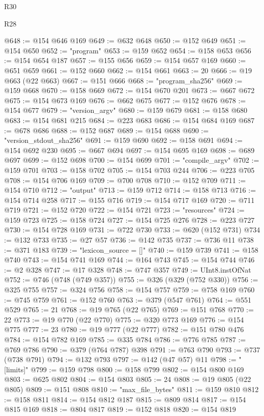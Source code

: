 \begin{lexlean}{R30}
\begin{lexlean}{R28}
\begin{coremodule}
{{{{{{{{{{{{{{{{{{{{{{{{{{{{{{{{{{{{{{{{{{{{{{{{{{{{{{{{{{{{{{{{{{{{{{{{{{{{{{{{{{{{{{{{{{{{{{{{{{{{{{{{{{{{{{{{{{{{{{{{{{{{{{{{{{{{{{{{{{{{{{{@648 := @154 @646 @169
@649 := @632 @648
@650 := @152 @649
@651 := @154 @650
@652 := "program"
@653 := @159 @652
@654 := @158 @653
@656 := @154 @654 @187
@657 := @155 @656
@659 := @154 @657 @169
@660 := @651 @659
@661 := @152 @660
@662 := @154 @661
@663 := 20
@666 := @19 @663 (@22 @663)
@667 := @151 @666
@668 := "program_sha256"
@669 := @159 @668
@670 := @158 @669
@672 := @154 @670 @201
@673 := @667 @672
@675 := @154 @673 @169
@676 := @662 @675
@677 := @152 @676
@678 := @154 @677
@679 := "version_argv"
@680 := @159 @679
@681 := @158 @680
@683 := @154 @681 @215
@684 := @223 @683
@686 := @154 @684 @169
@687 := @678 @686
@688 := @152 @687
@689 := @154 @688
@690 := "version_stdout_sha256"
@691 := @159 @690
@692 := @158 @691
@694 := @154 @692 @230
@695 := @667 @694
@697 := @154 @695 @169
@698 := @689 @697
@699 := @152 @698
@700 := @154 @699
@701 := "compile_argv"
@702 := @159 @701
@703 := @158 @702
@705 := @154 @703 @244
@706 := @223 @705
@708 := @154 @706 @169
@709 := @700 @708
@710 := @152 @709
@711 := @154 @710
@712 := "output"
@713 := @159 @712
@714 := @158 @713
@716 := @154 @714 @258
@717 := @155 @716
@719 := @154 @717 @169
@720 := @711 @719
@721 := @152 @720
@722 := @154 @721
@723 := "resources"
@724 := @159 @723
@725 := @158 @724
@727 := @154 @725 @276
@728 := @223 @727
@730 := @154 @728 @169
@731 := @722 @730
@733 := @620 (@152 @731)
@734 := @132 @733
@735 := @27 @57
@736 := @142 @735
@737 := @736 @11
@738 := @371 @183
@739 := "lexicon_source = []"
@740 := @159 @739
@741 := @158 @740
@743 := @154 @741 @169
@744 := @164 @743
@745 := @154 @744
@746 := @2 @328
@747 := @17 @328
@748 := @747 @357
@749 := UInt8.instOfNat
@752 := @746 (@748 (@749 @357))
@755 := @326 (@329 (@752 @330))
@756 := @325 @755
@757 := @324 @756
@758 := @154 @757
@759 := @758 @169
@760 := @745 @759
@761 := @152 @760
@763 := @379 (@547 @761)
@764 := @551 @529
@765 := 21
@768 := @19 @765 (@22 @765)
@769 := @151 @768
@770 := 22
@773 := @19 @770 (@22 @770)
@775 := @320 @773 @169
@776 := @154 @775
@777 := 23
@780 := @19 @777 (@22 @777)
@782 := @151 @780 @476
@784 := @154 @782 @169
@785 := @335 @784
@786 := @776 @785
@787 := @769 @786
@790 := @379 (@764 @787) @398
@791 := @763 @790
@793 := @737 (@738 @791)
@794 := @132 @793
@797 := @142 (@47 @57) @11
@798 := "[limits]"
@799 := @159 @798
@800 := @158 @799
@802 := @154 @800 @169
@803 := @625 @802
@804 := @154 @803
@805 := 24
@808 := @19 @805 (@22 @805)
@809 := @151 @808
@810 := "max_file_bytes"
@811 := @159 @810
@812 := @158 @811
@814 := @154 @812 @187
@815 := @809 @814
@817 := @154 @815 @169
@818 := @804 @817
@819 := @152 @818
@820 := @154 @819
}}}}}}}}}}}}}}}}}}}}}}}}}}}}}}}}}}}}}}}}}}}}}}}}}}}}}}}}}}}}}}}}}}}}}}}}}}}}}}}}}}}}}}}}}}}}}}}}}}}}}}}}}}}}}}}}}}}}}}}}}}}}}}}}}}}}}}}}}}}}}}}
\end{coremodule}
\end{lexlean}
\end{lexlean}
